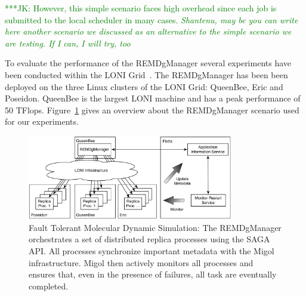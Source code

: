 \documentclass[times, 10pt,twocolumn]{article}
\newcommand{\kimnote}[1]{ {\textcolor{green} { ***JK: #1 }}}
\newcommand{\kimnote}[1]{}
\begin{document}

\kimnote{However, this simple scenario faces high overhead since each job is submitted to the local scheduler in many cases. \it Shantenu, may be you can write here another scenario we discussed as an alternative to the simple scenario we are testing.  If I can, I will try, too } 


\label{sec:exp}       
        
To evaluate the performance of the REMDgManager several experiments have been conducted 
within the LONI Grid~\cite{Allen:2003xy}. The REMDgManager has been been deployed on the 
three Linux clusters of the LONI Grid: QueenBee, Eric and Poseidon. 
QueenBee is the largest LONI machine and has a peak performance of 50 TFlops.                         
Figure~\ref{fig:saga-taskfarming} gives an overview about the REMDgManager scenario used for our experiments.  

\begin{figure}[t]
    \centering
        \includegraphics[width=0.8\textwidth]{saga-taskfarming}
    \caption{Fault Tolerant Molecular Dynamic Simulation: The REMDgManager orchestrates a set of distributed replica processes using the SAGA API. All processes synchronize important metadata with the Migol infrastructure. Migol then actively monitors all processes and ensures that, even in the presence of failures, all task are eventually completed.}
    \label{fig:saga-taskfarming}
\end{figure} 
\end{document}
